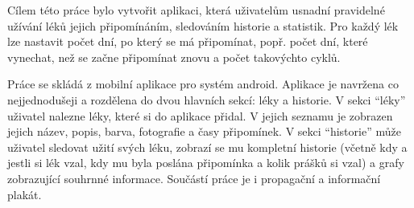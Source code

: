 \documentclass[../TakeYourPill.tex]{subfiles}
\begin{document}
Cílem této práce bylo vytvořit aplikaci, která uživatelům usnadní pravidelné užívání léků jejich připomínáním, sledováním historie a statistik. Pro každý lék lze nastavit počet dní, po který se má připomínat, popř. počet dní, které vynechat, než se začne připomínat znovu a počet takovýchto cyklů.

Práce se skládá z mobilní aplikace pro systém android. Aplikace je navržena co nejjednodušeji a rozdělena do dvou hlavních sekcí: léky a historie. V sekci \enquote{léky} uživatel nalezne léky, které si do aplikace přidal. V jejich seznamu je zobrazen jejich název, popis, barva, fotografie a časy připomínek. V sekci \enquote{historie} může uživatel sledovat užití svých léku, zobrazí se mu kompletní historie (včetně kdy a jestli si lék vzal, kdy mu byla poslána připomínka a kolik prášků si vzal) a grafy zobrazující souhrnné informace. Součástí práce je i propagační a informační plakát.
\end{document}
